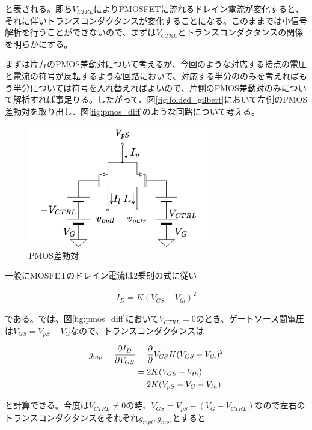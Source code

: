 \documentclass[twocolumn]{jsarticle}
\begin{document}
と表される。即ち$V_{CTRL}$によりPMOSFETに流れるドレイン電流が変化すると、それに伴いトランスコンダクタンスが変化することになる。このままでは小信号解析を行うことができないので、まずは$V_{CTRL}$とトランスコンダクタンスの関係を明らかにする。\par
まずは片方のPMOS差動対について考えるが、今回のような対応する接点の電圧と電流の符号が反転するような回路において、対応する半分ののみを考えればもう半分については符号を入れ替えればよいので、片側のPMOS差動対のみについて解析すれば事足りる。したがって、図\eqref{fig:folded_gilbert}において左側のPMOS差動対を取り出し、図\eqref{fig:pmos_diff}のような回路について考える。

\begin{figure}[h]
    \begin{center}
        \includegraphics*[width=80mm]{figures/pmos_diff.png}
        \caption{PMOS差動対}
        \label{fig:pmos_diff}
    \end{center}
\end{figure}%

一般にMOSFETのドレイン電流は2乗則の式に従い

\begin{align}
    I_{D}=K(V_{GS}-V_{th})^{2}  \label{eq:square}
\end{align}

である。では、図\eqref{fig:pmos_diff}において$V_{CTRL}=0$のとき、ゲートソース間電圧は$V_{GS}=V_{pS}-V_{G}$なので、トランスコンダクタンスは

\begin{align}
    g_{mp} = \frac{\partial I_{D}}{\partial V_{GS}} &= \frac{\partial}{\partial }V_{GS} K(V_{GS}-V_{th})^{2} \notag\\
    &=2K(V_{GS}-V_{th})    \notag\\ 
    &=2K(V_{pS}-V_{G}-V_{th})   \label{eq:g_mp}
\end{align}

と計算できる。今度は$V_{CTRL}\neq0$の時、$V_{GS}=V_{pS}- \left( V_{G}-V_{CTRL} \right)$なので左右のトランスコンダクタンスをそれぞれ$g_{mpl},g_{mpr}$とすると
\end{document}
